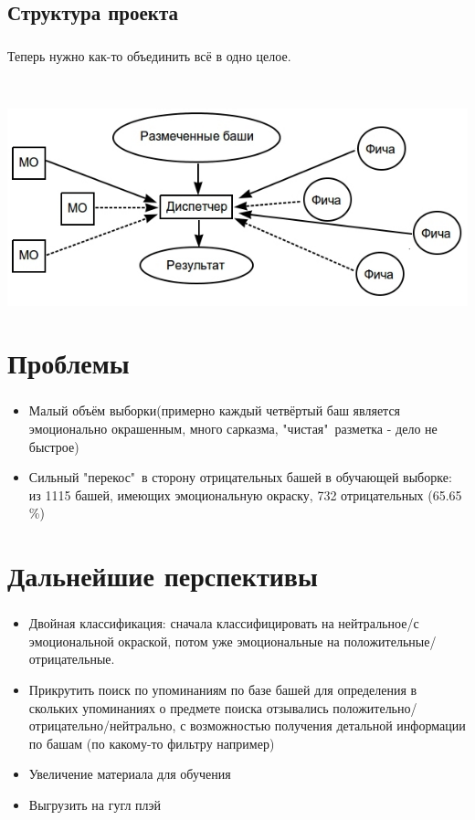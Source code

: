 \documentclass[t]{beamer}
\begin{document}
	\subsection{Структура проекта}
	\begin{frame}
		\frametitle{\insertsection}
		\framesubtitle{\insertsubsection}
		{Теперь нужно как-то объединить всё в одно целое.}\pause
		
		
		~
		
		\includegraphics[scale=0.52]{images/TheManager.jpg}
	\end{frame}	
	
	
	\section{Проблемы}
	
	\begin{frame}
		\frametitle{\insertsection}
		\begin{itemize}
			\item{Малый объём выборки(примерно каждый четвёртый баш является эмоционально окрашенным, много сарказма, "чистая"\ разметка - дело не быстрое)}\pause
			\item{Сильный "перекос"\ в сторону отрицательных башей в обучающей выборке: из 1115 башей, имеющих эмоциональную окраску, 732 отрицательных (65.65 \%)}
		\end{itemize}
	\end{frame}

	\section{Дальнейшие перспективы}
	\begin{frame}
		\frametitle{\insertsection}
		\begin{itemize}
			\item
			{Двойная классификация: сначала классифицировать на нейтральное/с эмоциональной окраской, потом уже эмоциональные на положительные/отрицательные. }\pause
			\item
			{Прикрутить поиск по упоминаниям по базе башей для определения в скольких упоминаниях о предмете поиска отзывались положительно/отрицательно/нейтрально, с возможностью получения детальной информации по башам (по какому-то фильтру например)}\pause
			\item
			Увеличение материала для обучения 
			\item
			Выгрузить на гугл плэй
			
		\end{itemize}
		
	\end{frame}
		
\end{document}
